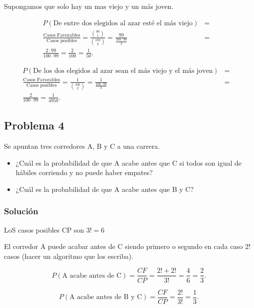 \documentclass[
]{article}
\providecommand{\tightlist}{%
  \setlength{\itemsep}{0pt}\setlength{\parskip}{0pt}}
\begin{document}
Supongamos que solo hay un mas viejo y un más joven.

\begin{eqnarray*}
P(\mbox{De entre dos elegidos al azar esté el más viejo}) &=&\\
\frac{\mbox{Casos Favorables}}{\mbox{Casos posibles}}=
\frac{{{99}\choose {1}}}{{{100}\choose {2}}}=\frac{99}{\frac{100\cdot 99}{2}}&=&\\
\frac{2\cdot 99}{100\cdot 99}=
\frac{2}{100}=\frac{1}{50}.
\end{eqnarray*}

\begin{eqnarray*}
P(\mbox{De los dos elegidos al azar sean  el más viejo y el más joven})&=&\\
\frac{\mbox{Casos Favorables}}{\mbox{Casos posibles}}=
\frac{1}{{{100} \choose {2}}}=\frac{1}{\frac{100\cdot 99}{2}}&=&\\
\frac{2}{100\cdot 99}
=\frac{1}{4950}.
\end{eqnarray*}

\hypertarget{problema-4}{%
\subsection{Problema 4}\label{problema-4}}

Se apuntan tres corredores A, B y C a una carrera.

\begin{itemize}
\tightlist
\item
  ¿Cuál es la probabilidad de que A acabe antes que C si todos son igual
  de hábiles corriendo y no puede haber empates?
\item
  ¿Cuál es la probabilidad de que A acabe antes que B y C?
\end{itemize}

\hypertarget{soluciuxf3n-4}{%
\subsubsection{Solución}\label{soluciuxf3n-4}}

LoS casos posibles CP son \(3!=6\)

El corredor A puede acabar antes de C siendo primero o segundo en cada
caso \(2!\) casos (hacer un algoritmo que los escriba).

\[P(\mbox{A acabe antes de C})=\frac{CF}{CP}=\frac{2!+2!}{3!}=\frac{4}{6}=\frac{2}{3}.\]

\[P(\mbox{A acabe antes de B y C})=\frac{CF}{CP}=\frac{2!}{3!}=\frac{1}{3}.\]
\end{document}
